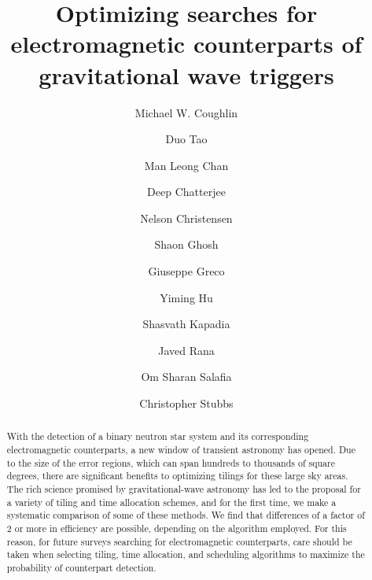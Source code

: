 \documentclass[twocolumn]{aastex61}
\begin{document}
\title{Optimizing searches for electromagnetic counterparts of gravitational wave triggers}

\author{Michael W. Coughlin}

\author{Duo Tao}

\author{Man Leong Chan}

\author{Deep Chatterjee}

\author{Nelson Christensen}

\author{Shaon Ghosh}

\author{Giuseppe Greco}

\author{Yiming Hu}

\author{Shasvath Kapadia}

\author{Javed Rana}

\author{Om Sharan Salafia}

\author{Christopher Stubbs}

\begin{abstract}
With the detection of a binary neutron star system and its corresponding electromagnetic counterparts, a new window of transient astronomy has opened. 
Due to the size of the error regions, which can span hundreds to thousands of square degrees, there are significant benefits to optimizing tilings for these large sky areas.
The rich science promised by gravitational-wave astronomy has led to the proposal for a variety of tiling and time allocation schemes, and for the first time, we make a systematic comparison of some of these methods.
We find that differences of a factor of 2 or more in efficiency are possible, depending on the algorithm employed.
For this reason, for future surveys searching for electromagnetic counterparts, care should be taken when selecting tiling, time allocation, and scheduling algorithms to maximize the probability of counterpart detection.

\end{abstract}
\end{document}
